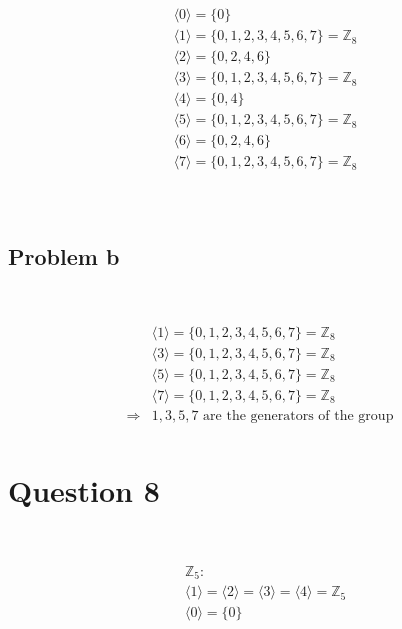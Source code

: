 \documentclass{article}
\begin{document}
\begin{equation*}
    \begin{split}
        &\langle0\rangle=\{0\}\\
        &\langle1\rangle=\{0,1,2,3,4,5,6,7\}=\mathbb{Z} _8\\
        &\langle2\rangle=\{0,2,4,6\}\\
        &\langle3\rangle=\{0,1,2,3,4,5,6,7\}=\mathbb{Z} _8\\
        &\langle4\rangle=\{0,4\}\\
        &\langle5\rangle=\{0,1,2,3,4,5,6,7\}=\mathbb{Z} _8\\
        &\langle6\rangle=\{0,2,4,6\}\\
        &\langle7\rangle=\{0,1,2,3,4,5,6,7\}=\mathbb{Z} _8\\
    \end{split}
\end{equation*}

~

\subsection*{Problem b}

~

\begin{equation*}
    \begin{split}
        &\langle1\rangle=\{0,1,2,3,4,5,6,7\}=\mathbb{Z} _8\\
        &\langle3\rangle=\{0,1,2,3,4,5,6,7\}=\mathbb{Z} _8\\
        &\langle5\rangle=\{0,1,2,3,4,5,6,7\}=\mathbb{Z} _8\\
        &\langle7\rangle=\{0,1,2,3,4,5,6,7\}=\mathbb{Z} _8\\
        \Rightarrow&1,3,5,7\text{ are the generators of the group}\\
    \end{split}
\end{equation*}

\newpage

\section*{Question 8}

~

\begin{equation*}
    \begin{split}
        &\mathbb{Z} _5:\\
        &\langle1\rangle=\langle2\rangle=\langle3\rangle=\langle4\rangle=\mathbb{Z}_5\\
        &\langle0\rangle=\{0\}\\
    \end{split}
\end{equation*}
\end{document}
